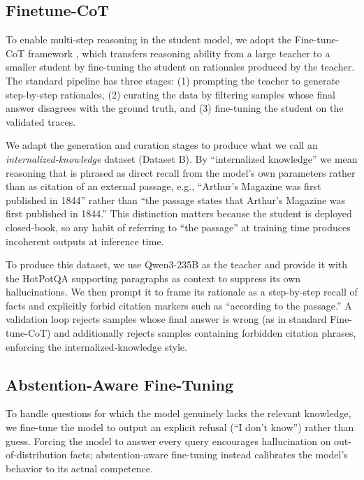 \documentclass[11pt]{article}
\begin{document}
\subsection{Finetune-CoT}\label{sec:finetune-cot}

To enable multi-step reasoning in the student model, we adopt the Fine-tune-CoT framework \cite{ho2023largelanguagemodelsreasoning}, which transfers reasoning ability from a large teacher to a smaller student by fine-tuning the student on rationales produced by the teacher. The standard pipeline has three stages: (1) prompting the teacher to generate step-by-step rationales, (2) curating the data by filtering samples whose final answer disagrees with the ground truth, and (3) fine-tuning the student on the validated traces.

We adapt the generation and curation stages to produce what we call an \emph{internalized-knowledge} dataset (Dataset B). By ``internalized knowledge'' we mean reasoning that is phrased as direct recall from the model's own parameters rather than as citation of an external passage, e.g., ``Arthur's Magazine was first published in 1844'' rather than ``the passage states that Arthur's Magazine was first published in 1844.'' This distinction matters because the student is deployed closed-book, so any habit of referring to ``the passage'' at training time produces incoherent outputs at inference time.

To produce this dataset, we use Qwen3-235B as the teacher and provide it with the HotPotQA supporting paragraphs as context to suppress its own hallucinations. We then prompt it to frame its rationale as a step-by-step recall of facts and explicitly forbid citation markers such as ``according to the passage.'' A validation loop rejects samples whose final answer is wrong (as in standard Fine-tune-CoT) and additionally rejects samples containing forbidden citation phrases, enforcing the internalized-knowledge style.

\subsection{Abstention-Aware Fine-Tuning}\label{sec:abstension}

To handle questions for which the model genuinely lacks the relevant knowledge, we fine-tune the model to output an explicit refusal (``I don't know'') rather than guess. Forcing the model to answer every query encourages hallucination on out-of-distribution facts; abstention-aware fine-tuning instead calibrates the model's behavior to its actual competence.
\end{document}
